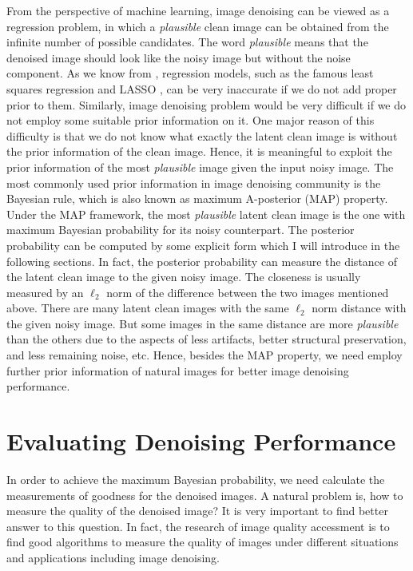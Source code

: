 From the perspective of machine learning, image denoising can be viewed as a regression problem, in which a \textsl{plausible} clean image can be obtained from the infinite number of possible candidates. The word \textsl{plausible} means that the denoised image should look like the noisy image but without the noise component. As we know from \cite{prml}, regression models, such as the famous least squares regression and LASSO \cite{lasso}, can be very inaccurate if we do not add proper prior to them. Similarly, image denoising problem would be very difficult if we do not employ some suitable prior information on it. One major reason of this difficulty is that we do not know what exactly the latent clean image is without the prior information of the clean image. Hence, it is meaningful to exploit the prior information of the most \textsl{plausible} image given the input noisy image. The most commonly used prior information in image denoising community is the Bayesian rule, which is also known as maximum A-posterior (MAP) property. Under the MAP framework, the most \textsl{plausible} latent clean image is the one with maximum Bayesian probability for its noisy counterpart. The posterior probability can be computed by some explicit form which I will introduce in the following sections. In fact, the posterior probability can measure the distance of the latent clean image to the given noisy image. The closeness is usually measured by an $\ell_{2}$ norm of the difference between the two images mentioned above. There are many latent clean images with the same $\ell_{2}$ norm distance with the given noisy image. But some images in the same distance are more \textsl{plausible} than the others due to the aspects of less artifacts, better structural preservation, and less remaining noise, etc. Hence, besides the MAP property, we need employ further prior information of natural images for better image denoising performance.


\section{Evaluating Denoising Performance}

In order to achieve the maximum Bayesian probability, we need calculate the measurements of goodness for the denoised images. A natural problem is, how to measure the quality of the denoised image? It is very important to find better answer to this question. In fact, the research of image quality accessment is to find good algorithms to measure the quality of images under different situations and applications including image denoising. 

